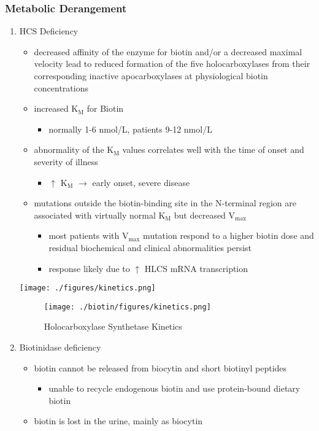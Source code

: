 \documentclass{scrartcl}
\begin{document}
\subsubsection{Metabolic Derangement}
\label{sec:orgb992e6b}
\begin{enumerate}
\item HCS Deficiency
\label{sec:org9a4a36d}
\begin{itemize}
\item decreased affinity of the enzyme for biotin and/or a decreased
maximal velocity lead to reduced formation of the five
holocarboxylases from their corresponding inactive apocarboxylases
at physiological biotin concentrations
\item increased K\(_{\text{M}}\) for Biotin
\begin{itemize}
\item normally 1-6 nmol/L, patients 9-12 nmol/L
\end{itemize}
\item abnormality of the K\(_{\text{M}}\) values correlates well with the time of onset
and severity of illness
\begin{itemize}
\item \(\uparrow\) K\(_{\text{M}}\) \(\to\) early onset, severe disease
\end{itemize}

\item mutations outside the biotin-binding site in the N-terminal region
are associated with virtually normal K\(_{\text{M}}\) but decreased V\(_{\text{max}}\)
\begin{itemize}
\item most patients with V\(_{\text{max}}\) mutation respond to a higher biotin
dose and residual biochemical and clinical abnormalities persist
\item response likely due to \(\uparrow\) HLCS mRNA transcription
\end{itemize}
\end{itemize}

\begin{center}
\texttt{[image: ./figures/kinetics.png]}
\end{center}

\begin{figure}[htbp]
\centering
\texttt{[image: ./biotin/figures/kinetics.png]}
\caption[Kinetics]{\label{fig:orga383bfd}
Holocarboxylase Synthetase Kinetics}
\end{figure}

\item Biotinidase deficiency
\label{sec:org25c6dad}
\begin{itemize}
\item biotin cannot be released from biocytin and short biotinyl
peptides
\begin{itemize}
\item unable to recycle endogenous biotin and use protein-bound dietary biotin
\end{itemize}
\item biotin is lost in the urine, mainly as biocytin
\end{itemize}
\end{enumerate}
\end{document}
